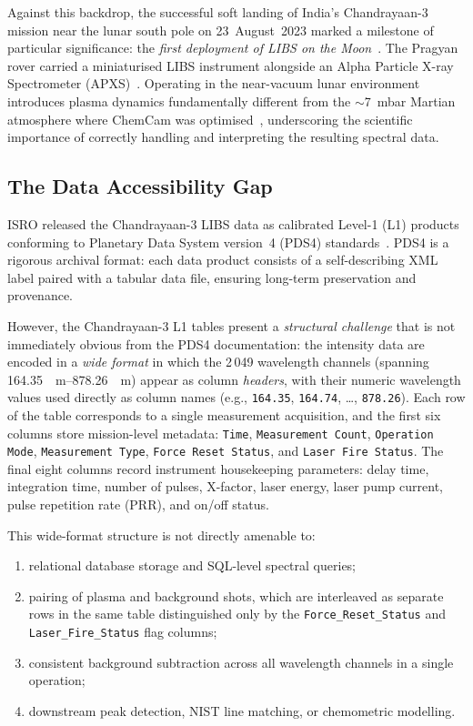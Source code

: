 \documentclass[a4paper,twocolumn,10pt]{article}
\begin{document}
Against this backdrop, the successful soft landing of India's
Chandrayaan-3 mission near the lunar south pole on 23~August~2023
marked a milestone of particular significance: the \emph{first
deployment of LIBS on the Moon}~\cite{ISROCh3}.  The Pragyan rover
carried a miniaturised LIBS instrument alongside an Alpha Particle
X-ray Spectrometer (APXS)~\cite{Laxmiprasad2020}.  Operating in the
near-vacuum lunar environment introduces plasma dynamics fundamentally
different from the $\sim$7~mbar Martian atmosphere where ChemCam was
optimised~\cite{Saeidfirozeh2024}, underscoring the scientific
importance of correctly handling and interpreting the resulting spectral
data.

\subsection{The Data Accessibility Gap}

ISRO released the Chandrayaan-3 LIBS data as calibrated Level-1 (L1)
products conforming to Planetary Data System version~4 (PDS4)
standards~\cite{Hughes2018}.  PDS4 is a rigorous archival format: each
data product consists of a self-describing XML label paired with a
tabular data file, ensuring long-term preservation and provenance.

However, the Chandrayaan-3 L1 tables present a \emph{structural
challenge} that is not immediately obvious from the PDS4 documentation:
the intensity data are encoded in a \emph{wide format} in which the
2\,049 wavelength channels (spanning \SIrange{164.35}{878.26}{\nano
\metre}) appear as column \emph{headers}, with their numeric wavelength
values used directly as column names (e.g., \texttt{164.35},
\texttt{164.74}, \ldots, \texttt{878.26}).  Each row of the table
corresponds to a single measurement acquisition, and the first six
columns store mission-level metadata: \texttt{Time},
\texttt{Measurement Count}, \texttt{Operation Mode},
\texttt{Measurement Type}, \texttt{Force Reset Status}, and
\texttt{Laser Fire Status}.  The final eight columns record instrument
housekeeping parameters: delay time, integration time, number of
pulses, X-factor, laser energy, laser pump current, pulse repetition
rate (PRR), and on/off status.

This wide-format structure is not directly amenable to:
\begin{enumerate}[nosep,leftmargin=*]
  \item relational database storage and SQL-level spectral queries;
  \item pairing of plasma and background shots, which are interleaved
    as separate rows in the same table distinguished only by the
    \texttt{Force\_Reset\_Status} and \texttt{Laser\_Fire\_Status}
    flag columns;
  \item consistent background subtraction across all wavelength
    channels in a single operation;
  \item downstream peak detection, NIST line matching, or
    chemometric modelling.
\end{enumerate}
\end{document}

